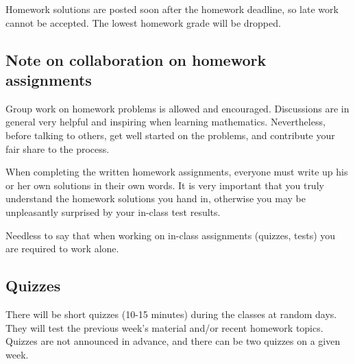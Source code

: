 \documentclass[oneside,11pt]{amsart}
\begin{document}
Homework solutions are posted soon after the
homework deadline, so late work cannot be accepted.
The lowest homework grade will be dropped.


%

\subsection*{Note on collaboration on homework assignments}
\label{collaboration}

Group work on homework problems is allowed and encouraged.
Discussions are in general very
helpful and inspiring when learning mathematics.
Nevertheless, before talking to others, get well started
on the problems, and contribute your fair share to the process.

When completing the written homework assignments, everyone must write up his or her own
solutions in their own words.
It is very important that you truly understand the homework solutions you hand
in, otherwise you may be unpleasantly surprised by your in-class test results.

Needless to say that when working on in-class assignments (quizzes, tests)
you are required to work alone.

\subsection{Quizzes}

There will be short quizzes (10-15 minutes)
during the classes at random days. 
They will test the previous week's material and/or recent homework
topics. 
Quizzes are not announced in advance, and there can be two quizzes
on a given week. 
\end{document}
